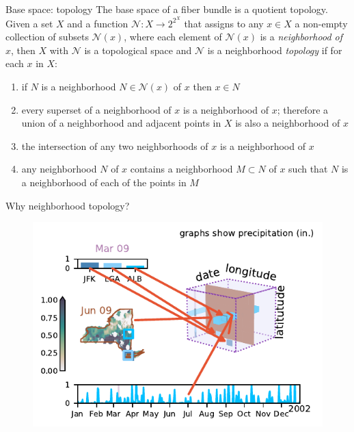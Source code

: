 \documentclass[xcolor={dvipsnames}]{beamer}
\begin{document}
\begin{frame}{Base space: topology}
The base space of a fiber bundle is a quotient topology\cite{munkresElementsAlgebraicTopology1984}. Given a set $X$ and a function $\mathcal{N}:X\to 2^{2^X}$ that assigns to any $x\in X$ a non-empty collection of subsets $\mathcal{N}(x)$, where each element of $\mathcal{N}(x)$ is a \emph{neighborhood of $x$}, then $X$ with  $\mathcal{N}$ is a \textcolor{base}{topological space} and $\mathcal{N}$ is a neighborhood \emph{topology} if for each $x$ in $X$: \cite{brownronaldTopologyGroupoids2006}

\begin{definition}\label{def:topology}
\begin{enumerate}
  \item if $N$ is a neighborhood $N \in \mathcal{N}(x)$ of $x$ then $x \in N$
  \item every superset of a neighborhood of $x$ is a neighborhood of $x$; therefore a union of a neighborhood and adjacent points in $X$ is also a neighborhood of $x$
  \item the intersection of any two neighborhoods of $x$ is a neighborhood of $x$
  \item any neighborhood $N$ of $x$ contains a neighborhood $M \subset N$ of $x$ such that $N$ is a neighborhood of each of the points in $M$
\end{enumerate}
\end{definition}
\end{frame}

\begin{frame}{Why neighborhood topology?}
\begin{figure}
\includegraphics[width=\linewidth]{../paper/figures/k_different_types.pdf}
\end{figure}
\end{frame}
\end{document}
